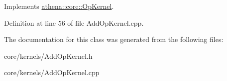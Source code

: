 Implements \mbox{\hyperlink{classathena_1_1core_1_1_op_kernel_a762e541463ffd089b47a8e6755c30fe1}{athena\+::core\+::\+Op\+Kernel}}.



Definition at line 56 of file Add\+Op\+Kernel.\+cpp.



The documentation for this class was generated from the following files\+:\begin{DoxyCompactItemize}
\item 
core/kernels/Add\+Op\+Kernel.\+h\item 
core/kernels/Add\+Op\+Kernel.\+cpp\end{DoxyCompactItemize}

